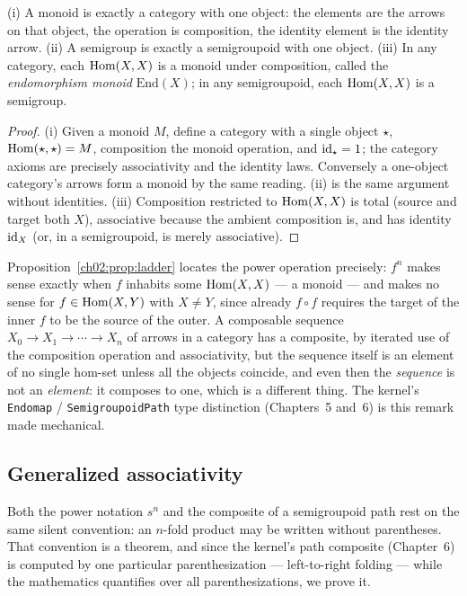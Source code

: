 \begin{proposition}\label{ch02:prop:ladder}
(i) A monoid is exactly a category with one object: the elements are the
arrows on that object, the operation is composition, the identity element
is the identity arrow. (ii) A semigroup is exactly a semigroupoid with one
object. (iii) In any category, each $\mathrm{Hom}(X, X)$ is a monoid under
composition, called the \emph{endomorphism monoid} $\mathrm{End}(X)$; in
any semigroupoid, each $\mathrm{Hom}(X, X)$ is a semigroup.
\end{proposition}

\begin{proof}
(i) Given a monoid $M$, define a category with a single object $\star$,
$\mathrm{Hom}(\star, \star) = M$, composition the monoid operation, and
$\mathrm{id}_\star = 1$; the category axioms are precisely associativity and the
identity laws. Conversely a one-object category's arrows form a monoid by
the same reading. (ii) is the same argument without identities. (iii)
Composition restricted to $\mathrm{Hom}(X, X)$ is total (source and target both
$X$), associative because the ambient composition is, and has identity
$\mathrm{id}_X$ (or, in a semigroupoid, is merely associative).
\end{proof}

\begin{remark}\label{ch02:rem:where-powers-live}
Proposition~\ref{ch02:prop:ladder} locates the power operation precisely:
$f^n$ makes sense exactly when $f$ inhabits some $\mathrm{Hom}(X, X)$ --- a monoid
--- and makes no sense for $f \in \mathrm{Hom}(X, Y)$ with $X \neq Y$, since
already $f \circ f$ requires the target of the inner $f$ to be the source
of the outer. A composable sequence
$X_0 \to X_1 \to \cdots \to X_n$ of arrows in a category has a composite,
by iterated use of the composition operation and associativity, but the
sequence itself is an element of no single hom-set unless all the objects
coincide, and even then the \emph{sequence} is not an \emph{element}: it
composes to one, which is a different thing. The kernel's
\texttt{Endomap} / \texttt{SemigroupoidPath} type distinction (Chapters~5
and~6) is this remark made mechanical.
\end{remark}

\subsection{Generalized associativity}

Both the power notation $s^n$ and the composite of a semigroupoid path
rest on the same silent convention: an $n$-fold product may be written
without parentheses. That convention is a theorem, and since the kernel's
path composite (Chapter~6) is computed by one particular parenthesization
--- left-to-right folding --- while the mathematics quantifies over all
parenthesizations, we prove it.

